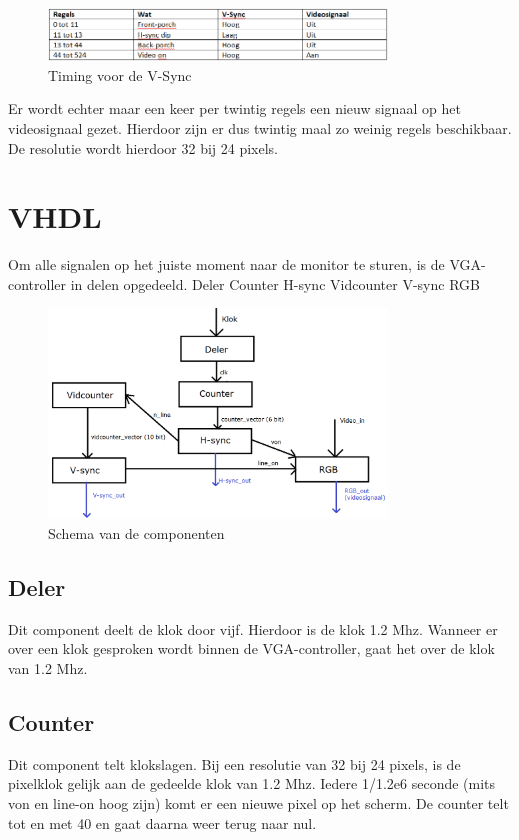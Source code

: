 \documentclass[oneside,dutch]{tudelft-report}
\begin{document}
\begin{figure}[H]
\center
\includegraphics[width=9cm]{tabel-VGA-2}
\caption{Timing voor de V-Sync}
\label{VGA}
\end{figure}

Er wordt echter maar een keer per twintig regels een nieuw signaal op het videosignaal gezet. Hierdoor zijn er dus twintig maal zo weinig regels beschikbaar. De resolutie wordt hierdoor 32 bij 24 pixels.

\section{VHDL}
Om alle signalen op het juiste moment naar de monitor te sturen, is de VGA-controller in delen opgedeeld. 
Deler
Counter
H-sync
Vidcounter
V-sync
RGB

\begin{figure}[H]
\center
\includegraphics[width=9cm]{schema-zonder-SRAM}
\caption{Schema van de componenten}
\label{VGA}
\end{figure}

\subsection{Deler}
Dit component deelt de klok door vijf. Hierdoor is de klok 1.2 Mhz. Wanneer er over een klok gesproken wordt binnen de VGA-controller, gaat het over de klok van 1.2 Mhz.

\subsection{Counter}
Dit component telt klokslagen. Bij een resolutie van 32 bij 24 pixels, is de pixelklok gelijk aan de gedeelde klok van 1.2 Mhz. Iedere 1/1.2e6 seconde (mits von en line-on hoog zijn) komt er een nieuwe pixel op het scherm. De counter telt tot en met 40 en gaat daarna weer terug naar nul.
\end{document}
